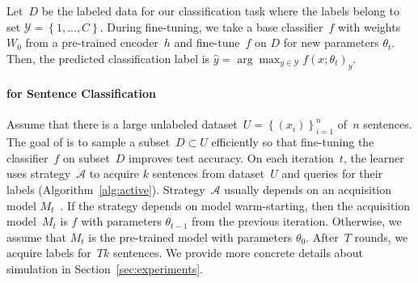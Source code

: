 Let~$D$ be the labeled data for our classification task where the labels belong to set $\mathcal{Y} = \left\{1,...,C\right\}$.
During fine-tuning, we take a base classifier~$f$ with weights~$W_0$ from a
pre-trained encoder~$h$ and fine-tune~$f$ on $D$ for new parameters
$\theta_t$.
Then, the predicted classification label is $\hat{y} = \arg\max_{y \in
\mathcal{Y}} f(x; \theta_t)_{y}$.

\paragraph{\al{} for Sentence Classification}
Assume that there is a large unlabeled dataset~$U = \left\{(x_{i}) \right\}_{i=1}^n$ of~$n$ sentences.
The goal of \al{} is to sample a subset~$D \subset U$ efficiently
so that fine-tuning the classifier~$f$ on subset~$D$ improves test accuracy.
On each iteration~$t$, the learner uses strategy~$\mathcal{A}$ to  acquire $k$ sentences
from dataset~$U$ and queries
for their labels (Algorithm~\ref{alg:active}).
Strategy~$\mathcal{A}$ usually depends on an acquisition model
$M_t$~\citep{lowell-2019}.
If the strategy depends on model warm-starting, then the acquisition model~$M_t$ is $f$ with parameters $\theta_{t-1}$ from the
previous iteration.  Otherwise, we assume that $M_t$ is the
pre-trained model with parameters $\theta_0$.
After~$T$ rounds, we acquire labels for~$Tk$
sentences.  We provide more concrete details about  simulation in
Section~\ref{sec:experiments}.

